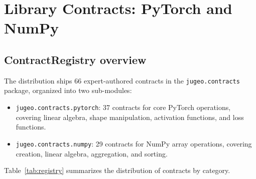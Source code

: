 \documentclass[11pt]{article}
\newcommand{\nPT}{37}                      %
\newcommand{\nNP}{29}                      %
\newcommand{\nTotal}{66}                   %
\begin{document}
\section{Library Contracts: PyTorch and NumPy}\label{sec:library-contracts}

\subsection{ContractRegistry overview}

The \JuGeo{} distribution ships \nTotal{} expert-authored contracts in
the \texttt{jugeo.contracts} package, organized into two sub-modules:
\begin{itemize}
  \item \texttt{jugeo.contracts.pytorch}: \nPT{} contracts for core
    PyTorch operations, covering linear algebra, shape manipulation,
    activation functions, and loss functions.
  \item \texttt{jugeo.contracts.numpy}: \nNP{} contracts for NumPy
    array operations, covering creation, linear algebra, aggregation,
    and sorting.
\end{itemize}

Table~\ref{tab:registry} summarizes the distribution of contracts by
category.
\end{document}
